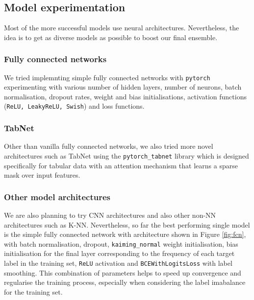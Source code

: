 \documentclass{article}
\begin{document}
\subsection{Model experimentation}
Most of the more successful models use neural architectures. Nevertheless, the idea is to get as diverse models as possible to boost our final ensemble.

\subsubsection{Fully connected networks}
We tried implemnting simple fully connected networks with \texttt{pytorch} experimenting with various number of hidden layers, number of neurons, batch normalisation, dropout rates, weight and bias initialisations, activation functions (\texttt{ReLU, LeakyReLU, Swish}) and loss functions. 

\subsubsection{TabNet}
Other than vanilla fully connected networks, we also tried more novel architectures such as TabNet \cite{tabnet} using the \texttt{pytorch\_tabnet} library which is designed specifically for tabular data with an attention mechanism that learns a sparse mask over input features. 

\subsubsection{Other model architectures}
We are also planning to try CNN architectures and also other non-NN architectures such as K-NN.  Nevertheless, so far the best performing single model is the simple fully connected network with architecture shown in Figure \ref{fig:fcn}, with batch normalisation, dropout, \texttt{kaiming\_normal} weight initialisation, bias initialisation for the final layer corresponding to the frequency of each target label in the training set, \texttt{ReLU} activation and \texttt{BCEWithLogitsLoss} with label smoothing. This combination of parameters helps to speed up convergence and regularise the training process, especially when considering the label imabalance for the training set.
\end{document}
